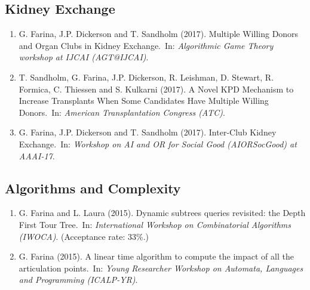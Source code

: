 \documentclass[10PT,letter]{article}
\newcounter{papercnt}
\newcommand{\subsectionstyle}[1]{\normalfont\selectfont\textcolor{titlecol}{\sffamily #1}}
\newcommand{\newl}{~}
\begin{document}
            \subsection*{\subsectionstyle{Kidney Exchange}}
            \begin{enumerate}[itemsep=.5mm]
                \setcounter{enumi}{\value{papercnt}}
                
                \item G. Farina, J.P. Dickerson and T. Sandholm (2017). Multiple Willing Donors and Organ Clubs in Kidney Exchange.\newl In: \textit{Algorithmic Game Theory workshop at IJCAI (AGT@IJCAI)}.
                
                \item T. Sandholm, G. Farina, J.P. Dickerson, R. Leishman, D. Stewart, R. Formica, C. Thiessen and S. Kulkarni (2017). A Novel KPD Mechanism to Increase Transplants When Some Candidates Have Multiple Willing Donors.\newl In: \textit{American Transplantation Congress (ATC)}.
            
                \item G. Farina, J.P. Dickerson and T. Sandholm (2017). Inter-Club Kidney Exchange.\newl In: \textit{Workshop on AI and OR for Social Good (AIORSocGood) at AAAI-17}.
            \end{enumerate}
            \setcounter{papercnt}{\value{enumi}}
   
            \subsection*{\subsectionstyle{Algorithms and Complexity}}
            \begin{enumerate}[itemsep=.5mm]
                \setcounter{enumi}{\value{papercnt}}

                \item G. Farina and L. Laura (2015). Dynamic subtrees queries revisited: the Depth First Tour Tree.\newl In: \textit{International Workshop on Combinatorial Algorithms (IWOCA)}. (Acceptance rate: 33\%.)
            
                \item G. Farina (2015). A linear time algorithm to compute the impact of all the articulation points.\newl In: \textit{Young Researcher Workshop on Automata, Languages and Programming (ICALP-YR)}.
            \end{enumerate}
            \setcounter{papercnt}{\value{enumi}}
\end{document}
